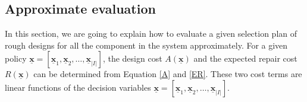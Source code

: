 \documentclass[preprint,12pt]{elsarticle}
\begin{document}


%

\subsection{Approximate evaluation}
In this section, we are going to explain how to evaluate a given selection plan of rough designs for all the component in the system approximately. For a given policy $\boldsymbol{\underline{x}}=[\boldsymbol{\underline{x}}_{1},\boldsymbol{\underline{x}}_{2},\dots,\boldsymbol{\underline{x}}_{\lvert I \rvert}]$, the design cost $A(\boldsymbol{\underline{x}})$ and the expected repair cost $R(\boldsymbol{\underline{x}})$ can be determined from Equation \eqref{A} and \eqref{ER}. These two cost terms are linear functions of the decision variables $\underline{\boldsymbol{x}}=[\boldsymbol{\underline{x}}_{1},\boldsymbol{\underline{x}}_{2},\dots,\boldsymbol{\underline{x}}_{\lvert I \rvert}]$. 
\end{document}
